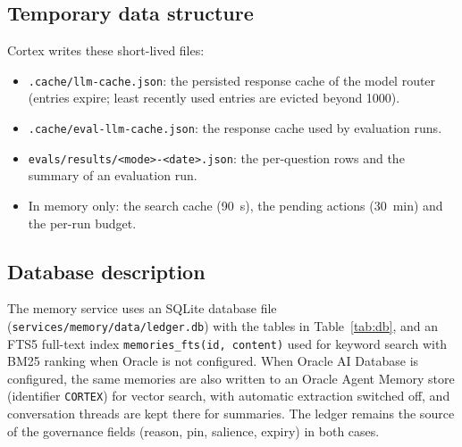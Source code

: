 \documentclass[oneside,a4paper,12pt]{report}
\begin{document}
\subsection{Temporary data structure}
Cortex writes these short-lived files:
\begin{itemize}
\item \texttt{.cache/llm-cache.json}: the persisted response cache of the model router (entries expire; least recently used entries are evicted beyond 1000).
\item \texttt{.cache/eval-llm-cache.json}: the response cache used by evaluation runs.
\item \texttt{evals/results/<mode>-<date>.json}: the per-question rows and the summary of an evaluation run.
\item In memory only: the search cache (90~s), the pending actions (30~min) and the per-run budget.
\end{itemize}
\subsection{Database description}
The memory service uses an SQLite database file (\texttt{services/\allowbreak{}memory/\allowbreak{}data/\allowbreak{}ledger.db}) with the tables in Table~\ref{tab:db}, and an FTS5 full-text index \texttt{memories\_fts(id, content)} used for keyword search with BM25 ranking when Oracle is not configured. When Oracle AI Database is configured, the same memories are also written to an Oracle Agent Memory store (identifier \texttt{CORTEX}) for vector search, with automatic extraction switched off, and conversation threads are kept there for summaries. The ledger remains the source of the governance fields (reason, pin, salience, expiry) in both cases.
\end{document}
